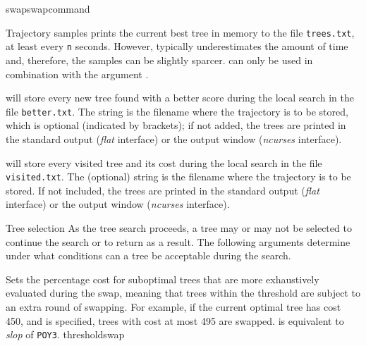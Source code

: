 \begin{command}{swap}{swapcommand}
\begin{arguments}
\begin{argumentgroup}{Trajectory samples}
                {  prints the current
                best tree in memory to the file \texttt{trees.txt}, at least every 
                \texttt{n} seconds. However, \poy typically underestimates the amount of
                time and, therefore, the samples can be slightly sparcer.  
                can only be used in combination with the argument .}
                {}

                { will store every new tree
                found with a better score during the local search in the file
                \texttt{better.txt}. The string is the filename where the
                trajectory is to be stored, which is optional (indicated by
                brackets); if not added, the trees are printed in the standard
                output (\emph{flat} interface) or the output window (\emph{ncurses} 
                interface).}
                {} 

                { will store every visited tree
                and its cost during the local search in the file
                \texttt{visited.txt}. The (optional) string is the filename where the
                trajectory is to be stored. If not included, the trees are printed
                in the standard output (\emph{flat} interface) or the output window (\emph{ncurses}
                interface).}
                {}
        \end{argumentgroup}
            
        \begin{argumentgroup}{Tree selection}
            {As the tree search proceeds, a tree may or may not be selected to
            continue the search or to return as a result. The following
            arguments determine under what conditions can a tree be acceptable
            during the search.}

                {Sets the percentage cost for suboptimal
                trees that are more exhaustively evaluated during the swap,
                meaning that trees within the threshold are subject to an extra
                round of swapping. For example, if the current
                optimal tree has cost 450, and  is specified, trees
                with cost at most 495 are swapped.   is
                equivalent to \emph{slop} of  \texttt{POY3}.}
                {thresholdswap}


\end{argumentgroup}
\end{arguments}
\end{command}
